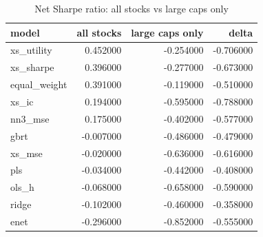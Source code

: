 \begin{table}
\caption{Net Sharpe ratio: all stocks vs large caps only}
\label{tab:t10_capacity}
\begin{tabular}{lrrr}
\toprule
model & all stocks & large caps only & delta \\
\midrule
xs\_utility & 0.452000 & -0.254000 & -0.706000 \\
xs\_sharpe & 0.396000 & -0.277000 & -0.673000 \\
equal\_weight & 0.391000 & -0.119000 & -0.510000 \\
xs\_ic & 0.194000 & -0.595000 & -0.788000 \\
nn3\_mse & 0.175000 & -0.402000 & -0.577000 \\
gbrt & -0.007000 & -0.486000 & -0.479000 \\
xs\_mse & -0.020000 & -0.636000 & -0.616000 \\
pls & -0.034000 & -0.442000 & -0.408000 \\
ols\_h & -0.068000 & -0.658000 & -0.590000 \\
ridge & -0.102000 & -0.460000 & -0.358000 \\
enet & -0.296000 & -0.852000 & -0.555000 \\
\bottomrule
\end{tabular}
\end{table}
